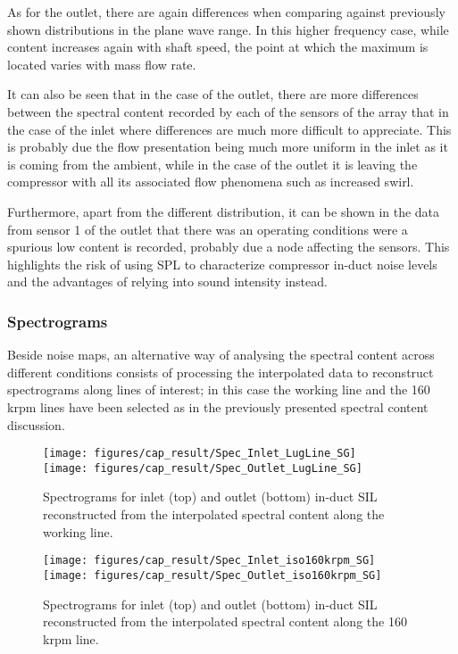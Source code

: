 As for the outlet, there are again differences when comparing against previously shown distributions in the plane wave range. In this higher frequency case, while content increases again with shaft speed, the point at which the maximum is located varies with mass flow rate.

It can also be seen that in the case of the outlet, there are more differences between the spectral content recorded by each of the sensors of the array that in the case of the inlet where differences are much more difficult to appreciate. This is probably due the flow presentation being much more uniform in the inlet as it is coming from the ambient, while in the case of the outlet it is leaving the compressor with all its associated flow phenomena such as increased swirl.

Furthermore, apart from the different distribution, it can be shown in the data from sensor 1 of the outlet that there was an operating conditions were a spurious low content is recorded, probably due a node affecting the sensors. This highlights the risk of using SPL to characterize compressor in-duct noise levels and the advantages of relying into sound intensity instead.

\subsubsection{Spectrograms}

Beside noise maps, an alternative way of analysing the spectral content across different conditions consists of processing the interpolated data to reconstruct spectrograms along lines of interest; in this case the working line and the 160 krpm lines have been selected as in the previously presented spectral content discussion.

\begin{figure}[tbh!]
\centering
\texttt{[image: figures/cap\_result/Spec\_Inlet\_LugLine\_SG]}\\[5mm]
\texttt{[image: figures/cap\_result/Spec\_Outlet\_LugLine\_SG]}
\caption{Spectrograms for inlet (top) and outlet (bottom) in-duct SIL reconstructed from the interpolated spectral content along the working line.}
\label{fig:result_LugLine_SG}
\end{figure}

\begin{figure}[tbh!]
\centering
\texttt{[image: figures/cap\_result/Spec\_Inlet\_iso160krpm\_SG]}\vspace{5mm}
\texttt{[image: figures/cap\_result/Spec\_Outlet\_iso160krpm\_SG]}
\caption{Spectrograms for inlet (top) and outlet (bottom) in-duct SIL reconstructed from the interpolated spectral content along the 160 krpm line.}
\label{fig:result_iso160krpm_SG}
\end{figure}



